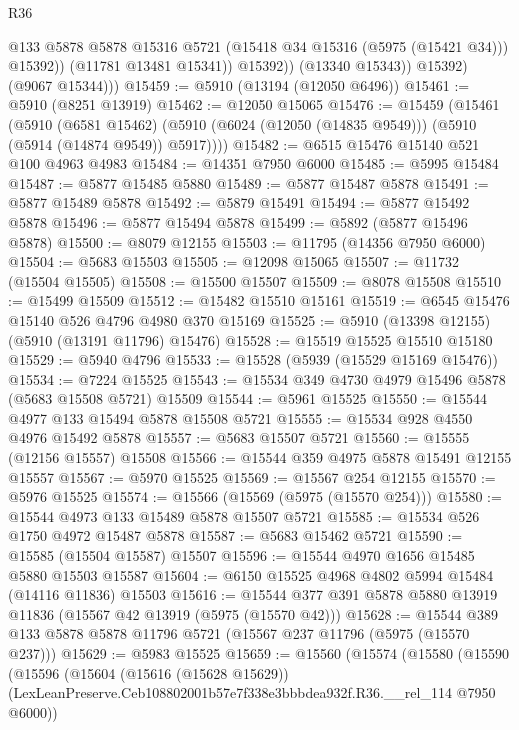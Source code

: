 \begin{lexlean}{R36}
\begin{coremodule}
                      @133
                      @5878
                      @5878
                      @15316
                      @5721
                      (@15418 @34 @15316 (@5975 (@15421 @34)))
                      @15392))
                  (@11781 @13481 @15341))
                @15392))
            (@13340 @15343))
          @15392)
        (@9067 @15344)))
@15459 := @5910 (@13194 (@12050 @6496))
@15461 := @5910 (@8251 @13919)
@15462 := @12050 @15065
@15476 := @15459
    (@15461
      (@5910
        (@6581 @15462)
        (@5910 (@6024 (@12050 (@14835 @9549))) (@5910 (@5914 (@14874 @9549)) @5917))))
@15482 := @6515 @15476 @15140 @521 @100 @4963 @4983
@15484 := @14351 @7950 @6000
@15485 := @5995 @15484
@15487 := @5877 @15485 @5880
@15489 := @5877 @15487 @5878
@15491 := @5877 @15489 @5878
@15492 := @5879 @15491
@15494 := @5877 @15492 @5878
@15496 := @5877 @15494 @5878
@15499 := @5892 (@5877 @15496 @5878)
@15500 := @8079 @12155
@15503 := @11795 (@14356 @7950 @6000)
@15504 := @5683 @15503
@15505 := @12098 @15065
@15507 := @11732 (@15504 @15505)
@15508 := @15500 @15507
@15509 := @8078 @15508
@15510 := @15499 @15509
@15512 := @15482 @15510 @15161
@15519 := @6545 @15476 @15140 @526 @4796 @4980 @370 @15169
@15525 := @5910 (@13398 @12155) (@5910 (@13191 @11796) @15476)
@15528 := @15519 @15525 @15510 @15180
@15529 := @5940 @4796
@15533 := @15528 (@5939 (@15529 @15169 @15476))
@15534 := @7224 @15525
@15543 := @15534 @349 @4730 @4979 @15496 @5878 (@5683 @15508 @5721) @15509
@15544 := @5961 @15525
@15550 := @15544 @4977 @133 @15494 @5878 @15508 @5721
@15555 := @15534 @928 @4550 @4976 @15492 @5878
@15557 := @5683 @15507 @5721
@15560 := @15555 (@12156 @15557) @15508
@15566 := @15544 @359 @4975 @5878 @15491 @12155 @15557
@15567 := @5970 @15525
@15569 := @15567 @254 @12155
@15570 := @5976 @15525
@15574 := @15566 (@15569 (@5975 (@15570 @254)))
@15580 := @15544 @4973 @133 @15489 @5878 @15507 @5721
@15585 := @15534 @526 @1750 @4972 @15487 @5878
@15587 := @5683 @15462 @5721
@15590 := @15585 (@15504 @15587) @15507
@15596 := @15544 @4970 @1656 @15485 @5880 @15503 @15587
@15604 := @6150 @15525 @4968 @4802 @5994 @15484 (@14116 @11836) @15503
@15616 := @15544 @377 @391 @5878 @5880 @13919 @11836 (@15567 @42 @13919 (@5975 (@15570 @42)))
@15628 := @15544 @389 @133 @5878 @5878 @11796 @5721 (@15567 @237 @11796 (@5975 (@15570 @237)))
@15629 := @5983 @15525
@15659 := @15560
    (@15574
      (@15580
        (@15590
          (@15596
            (@15604
              (@15616 (@15628 @15629))
              (LexLeanPreserve.Ceb108802001b57e7f338e3bbbdea932f.R36.__rel_114 @7950 @6000))

\end{coremodule}
\end{lexlean}
